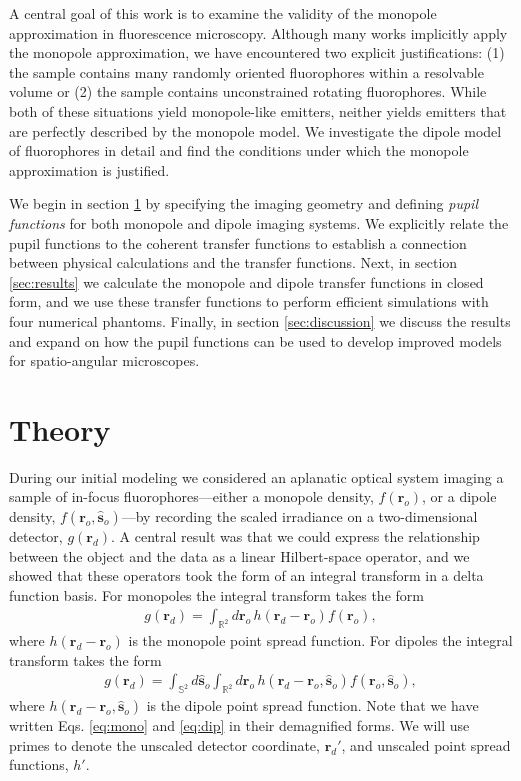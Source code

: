 \documentclass[]{osa-article}
\providecommand{\ro}{\mathbf{\mathbf{r}}_o}
\providecommand{\so}{\mathbf{\hat{s}}_o}
\providecommand{\rd}{\mathbf{r}_d}
\providecommand{\mbb}[1]{\mathbb{#1}}
\begin{document}
A central goal of this work is to examine the validity of the monopole
  approximation in fluorescence microscopy. Although many works implicitly
apply the monopole approximation, we have encountered two explicit
justifications: (1) the sample contains many randomly oriented fluorophores
within a resolvable volume or (2) the sample contains unconstrained rotating
fluorophores. While both of these situations yield monopole-like emitters,
neither yields emitters that are perfectly described by the monopole model. We
investigate the dipole model of fluorophores in detail and find the conditions
under which the monopole approximation is justified.

We begin in section \ref{sec:theory} by specifying the imaging geometry and
  defining \textit{pupil functions} for both monopole and dipole imaging
  systems. We explicitly relate the pupil functions to the coherent transfer
  functions to establish a connection between physical calculations and the
  transfer functions. Next, in section \ref{sec:results} we calculate the
  monopole and dipole transfer functions in closed form, and we use these
  transfer functions to perform efficient simulations with four numerical
  phantoms. Finally, in section \ref{sec:discussion} we discuss the results and
  expand on how the pupil functions can be used to develop improved models for
  spatio-angular microscopes.

\section{Theory}\label{sec:theory}
During our initial modeling \cite{chandler2018} we considered an
  aplanatic optical system imaging a sample of in-focus fluorophores---either a
  monopole density, $f(\ro)$, or a dipole density, $f(\ro, \so)$---by recording
  the scaled irradiance on a two-dimensional detector, $g(\rd)$. A central
  result was that we could express the relationship between the object and the
  data as a linear Hilbert-space operator, and we showed that these operators
  took the form of an integral transform in a delta function basis. For
  monopoles the integral transform takes the form
\begin{align}
  g(\rd) = \int_{\mbb{R}^2}d\ro\,h(\rd - \ro)f(\ro), \label{eq:mono}
\end{align}
where $h(\rd - \ro)$ is the monopole point spread function. For dipoles the
  integral transform takes the form
\begin{align}
  g(\rd) = \int_{\mbb{S}^2}d\so\int_{\mbb{R}^2}d\ro\,h(\rd - \ro,\so)f(\ro,\so),\label{eq:dip}
\end{align}
where $h(\rd - \ro, \so)$ is the dipole point spread function. Note that we
  have written Eqs. \eqref{eq:mono} and \eqref{eq:dip} in their
  demagnified forms. We will use primes to denote the unscaled detector
  coordinate, $\rd'$, and unscaled point spread functions, $h'$.
\end{document}
